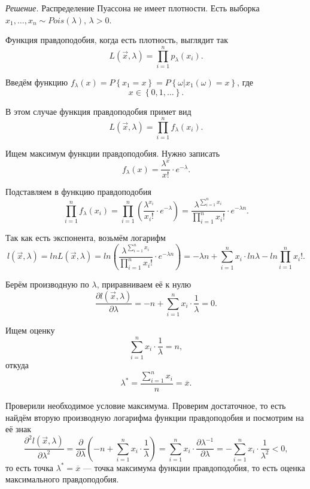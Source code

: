 \textit{Решение.} Распределение Пуассона не имеет плотности.
Есть выборка $x_1, \dotsc, x_n \sim Pois \left( \lambda \right), \, \lambda > 0$.

Функция правдоподобия, когда есть плотность, выглядит так
$$L \left( \vec{x}, \lambda \right) =
  \prod \limits_{i = 1}^n p_{ \lambda } \left( x_i \right).$$

Введём функцию
$f_{ \lambda } \left( x \right) =
  P \left\{ x_1 = x \right\} =
  P \left\{ \left. \omega \right| x_1 \left( \omega \right) = x \right\} $,
где
$$x \in
  \left\{ 0, 1, \dotsc \right\}.$$

В этом случае функция правдоподобия примет вид
$$L \left( \vec{x}, \lambda \right) =
  \prod \limits_{i = 1}^n f_{ \lambda } \left( x_i \right).$$

Ищем максимум функции правдоподобия.
Нужно записать
$$f_{ \lambda } \left( x \right) =
  \frac{ \lambda^x}{x!} \cdot e^{- \lambda }.$$

Подставляем в функцию правдоподобия
$$ \prod \limits_{i = 1}^n f_{ \lambda } \left( x_i \right) =
  \prod \limits_{i = 1}^n \left( \frac{ \lambda^{x_i}}{x_i!} \cdot e^{- \lambda } \right) =
  \frac{ \lambda^{ \sum \limits_{i = 1}^n x_i}}{ \prod \limits_{i = 1}^n x_i!} \cdot
  e^{- \lambda n}.$$

Так как есть экспонента, возьмём логарифм
$$l \left( \vec{x}, \lambda \right) =
  ln L \left( \vec{x}, \lambda \right) =
  ln \left(
    \frac{ \lambda^{ \sum \limits_{i = 1}^n x_i}}{ \prod \limits_{i = 1}^n x_i!} \cdot
    e^{- \lambda n}
  \right) =
  - \lambda n + \sum \limits_{i = 1}^n x_i \cdot ln \lambda - ln \prod \limits_{i = 1}^n x_i!.$$

Берём производную по $ \lambda $, приравниваем её к нулю
$$ \frac{ \partial l \left( \vec{x}, \lambda \right) }{ \partial \lambda } =
  -n + \sum \limits_{i = 1}^n x_i \cdot \frac{1}{ \lambda } =
  0.$$

Ищем оценку
$$ \sum \limits_{i = 1}^n x_i \cdot \frac{1}{ \lambda } =
  n,$$
откуда
$$ \lambda^* =
  \frac{ \sum \limits_{i = 1}^n x_i}{n} =
  \overline{x}.$$

Проверили необходимое условие максимума.
Проверим достаточное,
то есть найдём вторую производную логарифма функции правдоподобия и посмотрим на её знак
$$ \frac{ \partial^2 l \left( \vec{x}, \lambda \right) }{ \partial \lambda^2} =
  \frac{ \partial }{ \partial \lambda } \left(
    -n + \sum \limits_{i = 1}^n x_i \cdot \frac{1}{ \lambda }
  \right) =
  \sum \limits_{i = 1}^n x_i \cdot \frac{ \partial \lambda^{-1}}{ \partial \lambda } =
  - \sum \limits_{i = 1}^n x_i \cdot \frac{1}{ \lambda^2} <
  0,$$
то есть точка $ \lambda^* = \overline{x}$ --- точка максимума функции правдоподобия,
то есть оценка максимального правдоподобия.

